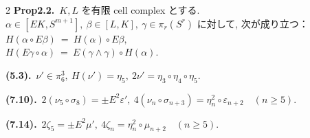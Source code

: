 \documentclass[10pt, leqno]{ltjsarticle}
\numberwithin{equation}{section}
\theoremstyle{plain}
\theoremstyle{definition}
\theoremstyle{remark}
\begin{document}
\begin{paracol}{2}
\noindent
\textbf{Prop2.2.}\
$K,L$ を有限 cell complex とする. \\
$\alpha\in[EK, S^{m+1}], \ \beta\in[L,K], \ \gamma\in\pi_r(S^r)$ 
に対して, 次が成り立つ：\\
\(
H(\alpha\circ E\beta)\ =\ H(\alpha)\circ E\beta,
\)\\
\(
H(E\gamma\circ\alpha)\ =\ E(\gamma\wedge\gamma)\circ H(\alpha).
\)

\noindent
\textbf{(5.3).}\
\(\nu'\in\pi_6^3,\ H(\nu')=\eta_5,\ 2\nu'=\eta_3\circ\eta_4\circ\eta_5 .\)

\noindent
\textbf{(7.10).}\
\(2(\nu_{5}\circ\sigma_{8})=\pm E^{2}\varepsilon',\
4(\nu_{n}\circ\sigma_{n+3})=\eta_{n}^{2}\circ\varepsilon_{n+2}\quad(n\ge5).\)

\noindent
\textbf{(7.14).}\
\(2\zeta_{5}=\pm E^{2}\mu',\
4\zeta_{n}=\eta_{n}^{2}\circ\mu_{n+2}\quad(n\ge5).\)






\end{paracol}
\end{document}
